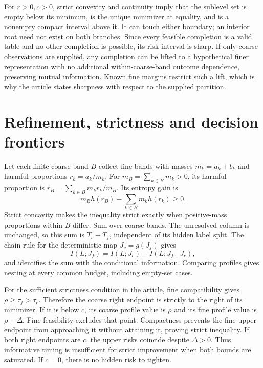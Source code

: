 For $r>0,c>0$, strict convexity and continuity imply that the sublevel set is empty below its minimum, is the unique minimizer at equality, and is a nonempty compact interval above it. It can touch either boundary; an interior root need not exist on both branches. Since every feasible completion is a valid table and no other completion is possible, its risk interval is sharp. If only coarse observations are supplied, any completion can be lifted to a hypothetical finer representation with no additional within-coarse-band outcome dependence, preserving mutual information. Known fine margins restrict such a lift, which is why the article states sharpness with respect to the supplied partition.

\section{Refinement, strictness and decision frontiers}
Let each finite coarse band $B$ collect fine bands with masses $m_k=a_k+b_k$ and harmful proportions $r_k=a_k/m_k$. For $m_B=\sum_{k\in B}m_k>0$, its harmful proportion is $\bar r_B=\sum_{k\in B}m_kr_k/m_B$. Its entropy gain is
\begin{equation}
 m_Bh(\bar r_B)-\sum_{k\in B}m_kh(r_k)\ge0.
\end{equation}
Strict concavity makes the inequality strict exactly when positive-mass proportions within $B$ differ. Sum over coarse bands. The unresolved column is unchanged, so this sum is $T_c-T_f$, independent of its hidden label split. The chain rule for the deterministic map $J_c=g(J_f)$ gives
\begin{equation}
 I(L;J_f)=I(L;J_c)+I(L;J_f\mid J_c),
\end{equation}
and identifies the sum with the conditional information. Comparing profiles gives nesting at every common budget, including empty-set cases.

For the sufficient strictness condition in the article, fine compatibility gives $\rho\ge\tau_f>\tau_c$. Therefore the coarse right endpoint is strictly to the right of its minimizer. If it is below $c$, its coarse profile value is $\rho$ and its fine profile value is $\rho+\Delta$. Fine feasibility excludes that point. Compactness prevents the fine upper endpoint from approaching it without attaining it, proving strict inequality. If both right endpoints are $c$, the upper risks coincide despite $\Delta>0$. Thus informative timing is insufficient for strict improvement when both bounds are saturated. If $c=0$, there is no hidden risk to tighten.

